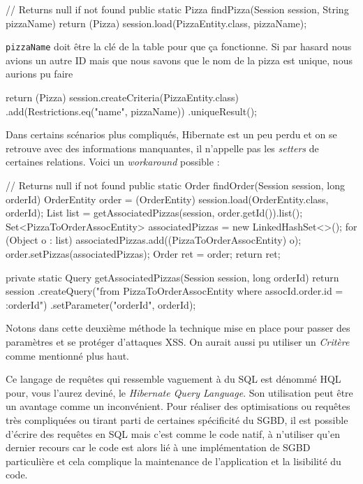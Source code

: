 \begin{javacode}
// Returns null if not found
public static Pizza findPizza(Session session, String pizzaName) {
    return (Pizza) session.load(PizzaEntity.class, pizzaName);
}
\end{javacode}

\verb|pizzaName| doit être la clé de la table pour que ça fonctionne.
Si par hasard nous avions un autre ID mais que nous savons que le nom de la pizza est unique, nous
aurions pu faire

\begin{javacode}
return (Pizza) session.createCriteria(PizzaEntity.class)
                      .add(Restrictions.eq("name", pizzaName))
                      .uniqueResult();
\end{javacode}

Dans certains scénarios plus compliqués, Hibernate est un peu perdu et on se retrouve avec des informations manquantes,
il n'appelle pas les \emph{setters} de certaines relations. Voici un \emph{workaround} possible :

\begin{javacode}
// Returns null if not found
public static Order findOrder(Session session, long orderId) {
    OrderEntity order = (OrderEntity) session.load(OrderEntity.class, orderId);
    List list = getAssociatedPizzas(session, order.getId()).list();
    Set<PizzaToOrderAssocEntity> associatedPizzas = new LinkedHashSet<>();
    for (Object o : list) {
        associatedPizzas.add((PizzaToOrderAssocEntity) o);
    }
    order.setPizzas(associatedPizzas);
    Order ret = order;
    return ret;
}

private static Query getAssociatedPizzas(Session session, long orderId) {
    return session
            .createQuery("from PizzaToOrderAssocEntity where assocId.order.id = :orderId")
            .setParameter("orderId", orderId);
}
\end{javacode}

Notons dans cette deuxième méthode la technique mise en place pour passer des paramètres et se protéger
d'attaques XSS. On aurait aussi pu utiliser un \emph{Critère} comme mentionné plus haut.

Ce langage de requêtes qui ressemble vaguement à du SQL est dénommé HQL pour, vous l'aurez deviné,
le \emph{Hibernate Query Language}. Son utilisation peut être un avantage comme un inconvénient.
Pour réaliser des optimisations ou requêtes très compliquées ou tirant parti de certaines spécificité
du SGBD, il est possible d'écrire des requêtes en SQL mais c'est comme le code natif, à n'utiliser qu'en 
dernier recours car le code est alors lié à une implémentation de SGBD particulière et cela complique
la maintenance de l'application et la lisibilité du code.

